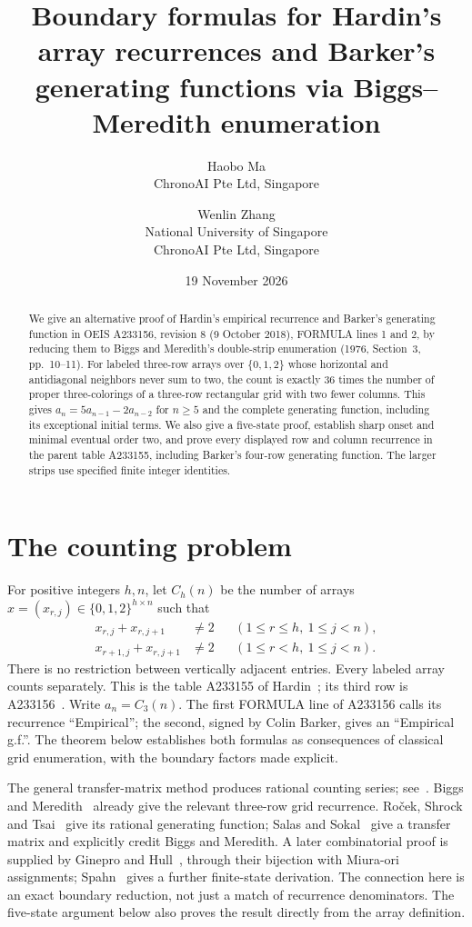 \documentclass[11pt,a4paper]{article}
\title{Boundary formulas for Hardin's array recurrences and Barker's generating functions via Biggs--Meredith enumeration}
\author{\begin{tabular}{c}Haobo Ma\\[-1mm]\small ChronoAI Pte Ltd, Singapore\end{tabular}
\and \begin{tabular}{c}Wenlin Zhang\\[-1mm]\small National University of Singapore\\[-1mm]\small ChronoAI Pte Ltd, Singapore\end{tabular}}
\date{19 November 2026}
\newcommand{\counts}{C}
\begin{document}
\maketitle
\begin{abstract}
We give an alternative proof of Hardin's empirical recurrence and Barker's
generating function in OEIS A233156, revision 8 (9 October 2018), FORMULA
lines 1 and 2, by reducing them to Biggs and Meredith's double-strip
enumeration (1976, Section~3, pp.~10--11).
For labeled three-row arrays over \(\{0,1,2\}\) whose horizontal and
antidiagonal neighbors never sum to two, the count is exactly 36 times
the number of proper three-colorings of a three-row rectangular grid
with two fewer columns. This gives \(a_n=5a_{n-1}-2a_{n-2}\) for
\(n\ge5\) and the complete generating function, including its exceptional
initial terms. We also give a five-state proof, establish sharp onset and
minimal eventual order two, and prove every displayed row and column
recurrence in the parent table A233155, including Barker's four-row
generating function. The larger strips use specified finite integer
identities.
\end{abstract}

\section{The counting problem}
For positive integers \(h,n\), let \(\counts_h(n)\) be the number of arrays
\(x=(x_{r,j})\in\{0,1,2\}^{h\times n}\) such that
\begin{align}
 x_{r,j}+x_{r,j+1}&\ne2 &&(1\le r\le h,\ 1\le j<n),\label{eq:horizontal}\\
 x_{r+1,j}+x_{r,j+1}&\ne2 &&(1\le r<h,\ 1\le j<n).\label{eq:diagonal}
\end{align}
There is no restriction between vertically adjacent entries. Every labeled
array counts separately. This is the table A233155 of Hardin~\cite{parent};
its third row is A233156~\cite{source}. Write \(a_n=\counts_3(n)\).
The first FORMULA line of A233156 calls its recurrence ``Empirical'';
the second, signed by Colin Barker, gives an ``Empirical g.f.''.
The theorem below establishes both formulas as consequences of classical
grid enumeration, with the boundary factors made explicit.

The general transfer-matrix method produces rational counting series;
see~\cite[Section V.6]{ac}.
Biggs and Meredith~\cite[Section~3, Theorem~2 and p.~11]{bm} already give
the relevant three-row grid recurrence. Ro\v{c}ek, Shrock and Tsai~\cite[
Section~II.B]{rst} give its rational generating function; Salas and
Sokal~\cite[Section~5.2]{ss} give a transfer matrix and explicitly credit
Biggs and Meredith. A later combinatorial proof is supplied by Ginepro
and Hull~\cite[Section~3 and Theorem~4]{gh}, through their bijection with
Miura-ori assignments; Spahn~\cite[Section~6.1]{spahn} gives a further
finite-state derivation. The connection here is an exact boundary
reduction, not just a match of recurrence denominators. The five-state
argument below also proves the result directly from the array definition.
\end{document}
